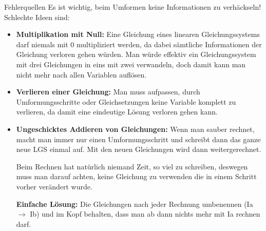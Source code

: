 \begin{bla}{Fehlerquellen}
\label{LA:LGS:Fehlerquellen}
Es ist wichtig, beim Umformen keine Informationen zu verhäckseln!\\
Schlechte Ideen sind:

\begin{itemize}
  \item \textbf{Multiplikation mit Null:} %
    Eine Gleichung eines linearen Gleichungssystems darf niemals mit $0$ multipliziert werden, da dabei sämtliche Informationen der Gleichung verloren gehen würden. Man würde effektiv ein Gleichungssystem mit drei Gleichungen in eins mit zwei verwandeln, doch damit kann man nicht mehr nach allen Variablen auflösen.
  \item \textbf{Verlieren einer Gleichung:}
    Man muss aufpassen, durch Umformungsschritte oder Gleichsetzungen keine Variable komplett zu verlieren, da damit eine eindeutige Lösung verloren gehen kann.
  \item \textbf{Ungeschicktes Addieren von Gleichungen:}
    Wenn man sauber rechnet, macht man immer nur einen Umformungsschritt und schreibt dann das ganze neue LGS einmal auf.
    Mit den neuen Gleichungen wird dann weitergerechnet.

    Beim Rechnen hat natürlich niemand Zeit, so viel zu schreiben, deswegen muss man darauf achten, keine Gleichung zu verwenden die in einem Schritt vorher verändert wurde.

    \textbf{Einfache Lösung:} Die Gleichungen nach jeder Rechnung umbenennen (Ia $\to$ Ib) und im Kopf behalten, dass man ab dann nichts mehr mit Ia rechnen darf.
\end{itemize}
\end{bla}

\clearpage

